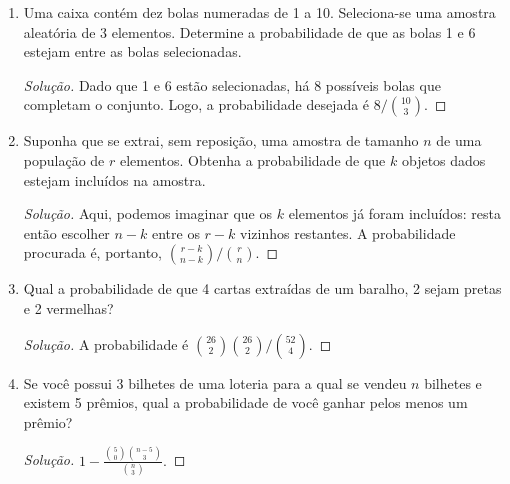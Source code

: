 \documentclass[../Notas.tex]{subfiles}
\begin{document}
\begin{enumerate}
\begin{proof}[Solução]
\begin{enumerate}[a)]
            \item $\binom{13}{2}\cdot\binom{4}{2}\cdot\binom{4}{2}\cdot 44\cdot q$.
            \item $13\cdot\binom{4}{2}\cdot\binom{12}{3}\cdot 4^3\cdot q$.
        \end{enumerate}
    \end{proof}
    \item Uma caixa contém dez bolas numeradas de 1 a 10. Seleciona-se uma amostra aleatória de 3 elementos. Determine a probabilidade de que as bolas 1 e 6 estejam entre as bolas selecionadas.
    \begin{proof}[Solução]
        Dado que 1 e 6 estão selecionadas, há 8 possíveis bolas que completam o conjunto. Logo,
        a probabilidade desejada é $8/\binom{10}{3}$.
    \end{proof}
    \item  Suponha que se extrai, sem reposição, uma amostra de tamanho $n$ de uma população de $r$ elementos. Obtenha a probabilidade de que $k$ objetos dados estejam incluídos na amostra.
    \begin{proof}[Solução]
        Aqui, podemos imaginar que os $k$ elementos já foram incluídos: resta então escolher
        $n-k$ entre os $r-k$ vizinhos restantes. A probabilidade procurada é, portanto,
        $\binom{r-k}{n-k}/\binom{r}{n}$.
    \end{proof}
    \item Qual a probabilidade de que 4 cartas extraídas de um baralho, 2 sejam pretas e 2 vermelhas?
    \begin{proof}[Solução]
        A probabilidade é $\binom{26}{2}\binom{26}{2}/\binom{52}{4}$.
    \end{proof}
    \item Se você possui 3 bilhetes de uma loteria para a qual se vendeu $n$ bilhetes e existem 5 prêmios, qual a probabilidade de você ganhar pelos menos um prêmio?
    \begin{proof}[Solução]
        $1 - \frac{\binom{5}{0}\binom{n-5}{3}}{\binom{n}{3}}.$
    \end{proof}
\end{enumerate}
\end{document}
